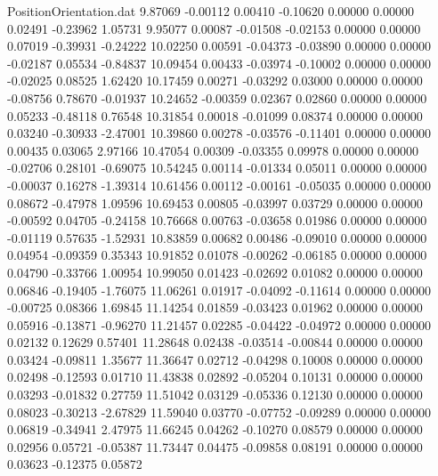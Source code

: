 \begin{filecontents}{PositionOrientation.dat}
   9.87069   -0.00112    0.00410    -0.10620    0.00000    0.00000    0.02491   -0.23962    1.05731
   9.95077    0.00087   -0.01508    -0.02153    0.00000    0.00000    0.07019   -0.39931   -0.24222
  10.02250    0.00591   -0.04373    -0.03890    0.00000    0.00000   -0.02187    0.05534   -0.84837
  10.09454    0.00433   -0.03974    -0.10002    0.00000    0.00000   -0.02025    0.08525    1.62420
  10.17459    0.00271   -0.03292     0.03000    0.00000    0.00000   -0.08756    0.78670   -0.01937
  10.24652   -0.00359    0.02367     0.02860    0.00000    0.00000    0.05233   -0.48118    0.76548
  10.31854    0.00018   -0.01099     0.08374    0.00000    0.00000    0.03240   -0.30933   -2.47001
  10.39860    0.00278   -0.03576    -0.11401    0.00000    0.00000    0.00435    0.03065    2.97166
  10.47054    0.00309   -0.03355     0.09978    0.00000    0.00000   -0.02706    0.28101   -0.69075
  10.54245    0.00114   -0.01334     0.05011    0.00000    0.00000   -0.00037    0.16278   -1.39314
  10.61456    0.00112   -0.00161    -0.05035    0.00000    0.00000    0.08672   -0.47978    1.09596
  10.69453    0.00805   -0.03997     0.03729    0.00000    0.00000   -0.00592    0.04705   -0.24158
  10.76668    0.00763   -0.03658     0.01986    0.00000    0.00000   -0.01119    0.57635   -1.52931
  10.83859    0.00682    0.00486    -0.09010    0.00000    0.00000    0.04954   -0.09359    0.35343
  10.91852    0.01078   -0.00262    -0.06185    0.00000    0.00000    0.04790   -0.33766    1.00954
  10.99050    0.01423   -0.02692     0.01082    0.00000    0.00000    0.06846   -0.19405   -1.76075
  11.06261    0.01917   -0.04092    -0.11614    0.00000    0.00000   -0.00725    0.08366    1.69845
  11.14254    0.01859   -0.03423     0.01962    0.00000    0.00000    0.05916   -0.13871   -0.96270
  11.21457    0.02285   -0.04422    -0.04972    0.00000    0.00000    0.02132    0.12629    0.57401
  11.28648    0.02438   -0.03514    -0.00844    0.00000    0.00000    0.03424   -0.09811    1.35677
  11.36647    0.02712   -0.04298     0.10008    0.00000    0.00000    0.02498   -0.12593    0.01710
  11.43838    0.02892   -0.05204     0.10131    0.00000    0.00000    0.03293   -0.01832    0.27759
  11.51042    0.03129   -0.05336     0.12130    0.00000    0.00000    0.08023   -0.30213   -2.67829
  11.59040    0.03770   -0.07752    -0.09289    0.00000    0.00000    0.06819   -0.34941    2.47975
  11.66245    0.04262   -0.10270     0.08579    0.00000    0.00000    0.02956    0.05721   -0.05387
  11.73447    0.04475   -0.09858     0.08191    0.00000    0.00000    0.03623   -0.12375    0.05872

\end{filecontents}
